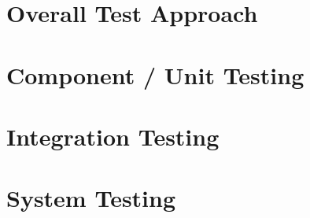 

\section{Overall Test Approach}

\section{Component / Unit Testing}

\section{Integration Testing}

\section{System Testing}







